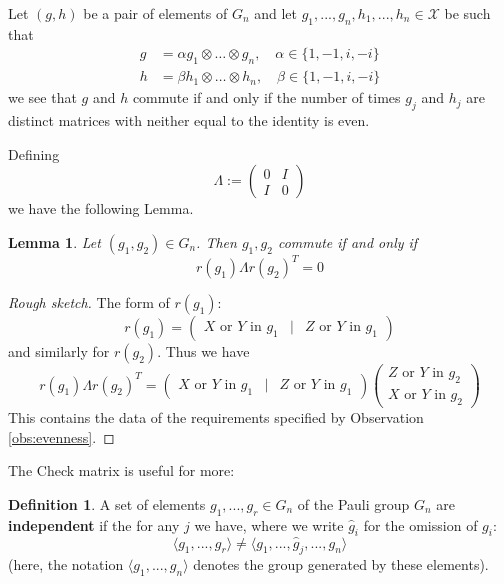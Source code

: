 \documentclass[12pt]{article}
\theoremstyle{plain}
\newtheorem{lemma}[thm]{Lemma}
\theoremstyle{definition}
\newtheorem{defn}[thm]{Definition} %
\newcommand{\scr}[1]{\mathscr{#1}}
\begin{document}
\begin{observation}\label{obs:evenness}
	Let $(g,h)$ be a pair of elements of $G_n$ and let $g_1,...,g_n, h_1,...,h_n \in \scr{X}$ be such that
	\begin{align*}
		g &= \alpha g_1 \otimes \hdots \otimes g_n,\quad \alpha \in \{ 1,-1,i,-i \}\\
		h &= \beta h_1 \otimes \hdots \otimes h_n,\quad \beta \in \{ 1,-1,i,-i \}
	\end{align*}
	we see that $g$ and $h$ commute if and only if the number of times $g_j$ and $h_j$ are distinct matrices with neither equal to the identity is even. 
\end{observation}
Defining
\begin{equation}
	\Lambda :=
	\begin{pmatrix}
		0 & I\\
		I & 0
	\end{pmatrix}
\end{equation}
we have the following Lemma.
\begin{lemma}
	Let $(g_1,g_2) \in G_n$. Then $g_1,g_2$ commute if and only if
	\begin{equation}
		r(g_1) \Lambda r(g_2)^T = 0
	\end{equation}
\end{lemma}
\begin{proof}[Rough sketch]
	The form of $r(g_1)$:
	\begin{equation}
		r(g_1) =
		\begin{pmatrix}
			X \text{ or } Y \text{ in }g_1 & | & Z \text{ or } Y\text{ in }g_1
		\end{pmatrix}
	\end{equation}
	and similarly for $r(g_2)$. Thus we have
	\begin{equation}
		r(g_1) \Lambda r(g_2)^T = \begin{pmatrix}
			X \text{ or } Y \text{ in }g_1 & | & Z \text{ or } Y\text{ in }g_1
		\end{pmatrix}
		\begin{pmatrix}
			Z \text{ or } Y \text{ in }g_2\\
			X \text{ or } Y \text{ in }g_2
		\end{pmatrix}
	\end{equation}
	This contains the data of the requirements specified by Observation \ref{obs:evenness}.
\end{proof}
The Check matrix is useful for more:
\begin{defn}
	A set of elements $g_1,...,g_r \in G_n$ of the Pauli group $G_n$ are \textbf{independent} if the for any $j$ we have, where we write $\hat{g}_i$ for the omission of $g_i$:
	\begin{equation}
		\langle g_1,...,g_r \rangle \neq \langle g_1,...,\hat{g}_j, ..., g_n\rangle
	\end{equation}
	(here, the notation $\langle g_1,...,g_n\rangle$ denotes the group generated by these elements).
\end{defn}
\end{document}
